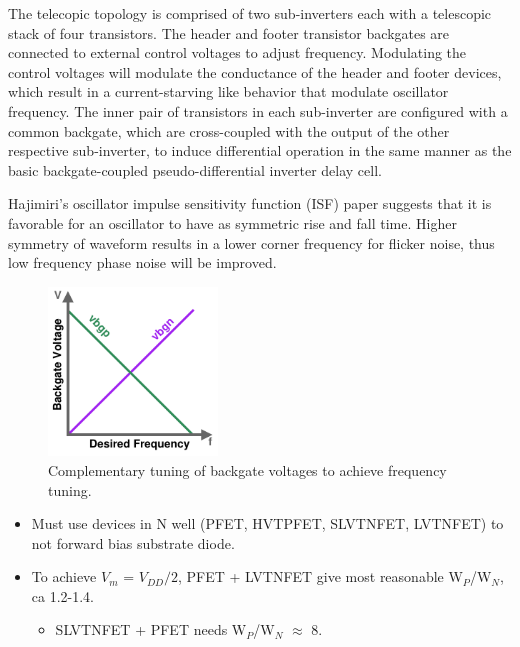 			The telecopic topology is comprised of two sub-inverters each with a telescopic stack of four transistors. The header and footer transistor backgates are connected to external control voltages to adjust frequency. Modulating the control voltages will modulate the conductance of the header and footer devices, which result in a current-starving like behavior that modulate oscillator frequency. The inner pair of transistors in each sub-inverter are configured with a common backgate, which are cross-coupled with the output of the other respective sub-inverter, to induce differential operation in the same manner as the basic backgate-coupled pseudo-differential inverter delay cell. 

			Hajimiri's oscillator impulse sensitivity function (ISF) paper \cite{Hajimiri1998} suggests that it is favorable for an oscillator to have as symmetric rise and fall time. Higher symmetry of waveform results in a lower corner frequency for flicker noise, thus low frequency phase noise will be improved.



			\begin{figure}[htb!]
			    \centering
			    \includegraphics[width=0.4\textwidth, angle=0]{./figs/design/tuning}
			    \caption{Complementary tuning of backgate voltages to achieve frequency tuning.}
			    \label{fig:bg_tuning_scheme}
			\end{figure}



			\begin{itemize}[itemsep=4pt,label=\protect---]
				\item Must use devices in N well (PFET, HVTPFET, SLVTNFET, LVTNFET) to not forward bias substrate diode.
				\item To achieve $V_{m}$ =  $V_{DD}/2$, PFET + LVTNFET give most reasonable W$_P$/W$_N$, ca 1.2-1.4.
				\begin{itemize}[itemsep=4pt,label=$\bullet$]
					\item SLVTNFET + PFET needs W$_P$/W$_N$ $\approx$ 8.
				\end{itemize}
			\end{itemize}



